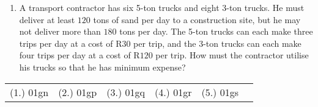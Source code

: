 \begin{eocexercises}{}
\begin{enumerate}
\item{A transport contractor has six 5-ton trucks and eight 3-ton trucks.  He must deliver at least $120$ tons of sand per day to a construction site, but he may not deliver more than $180$ tons per day. The 5-ton trucks can each make three trips per day at a cost of R$30$ per trip, and the 3-ton trucks can each make four trips per day at a cost of R$120$ per trip.  How must the contractor utilise his trucks so that he has minimum expense?}

\end{enumerate}






\par \practiceinfo
\par \begin{tabular}[h]{cccccc}
(1.)	01gn	&
(2.)	01gp	&
(3.)	01gq	&
(4.)	01gr	&
(5.)	01gs	&
\end{tabular}
\end{eocexercises}
